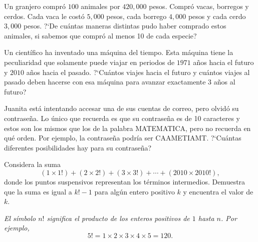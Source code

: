 \begin{Solucion}
  
\end{Solucion}

\begin{Problema}{2}
  Un granjero compr\'o $100$ animales por $420,000$ pesos. Compr\'o
  vacas, borregos y cerdos. Cada vaca le cost\'o $5,000$ pesos, cada
  borrego $4,000$ pesos y cada cerdo $3,000$ pesos. ?`De cu\'antas
  maneras distintas pudo haber comprado estos animales, si sabemos que
  compr\'o al menos 10 de cada especie?
\end{Problema}

\begin{Solucion}
  
\end{Solucion}

\begin{Problema}{3}
  Un cient\'ifico ha inventado una m\'aquina del tiempo. Esta
  m\'aquina tiene la peculiaridad que solamente puede viajar en
  periodos de $1971$ a\~nos hacia el futuro y $2010$ a\~nos hacia el
  pasado. ?`Cu\'antos viajes hacia el futuro y cu\'antos viajes al
  pasado deben hacerse con esa m\'aquina para avanzar exactamente $3$
  a\~nos al futuro?
\end{Problema}

\begin{Solucion}
  
\end{Solucion}

\begin{Problema}{4}
  Juanita est\'a intentando accesar una de sus cuentas de correo, pero
  olvid\'o su contrase\~na. Lo \'unico que recuerda es que su
  contrase\~na es de 10 caracteres y estos son los mismos que los de
  la palabra MATEMATICA, pero no recuerda en qu\'e orden. Por ejemplo,
  la contrase\~na podr\'ia ser CAAMETIAMT. ?`Cu\'antas diferentes
  posibilidades hay para su contrase\~na?
\end{Problema}

\begin{Solucion}
  
\end{Solucion}

\begin{Problema}{5}
  Considera la suma
  $$
  (1 \times 1!) + (2 \times 2!) + (3 \times 3!) +  \cdots + (2010 \times 2010!),
  $$ 
  donde los puntos suspensivos representan los t\'erminos
  intermedios. Demuestra que la suma es igual a $k!-1$ para alg\'un
  entero positivo $k$ y encuentra el valor de $k$.

  {\sl El s\'imbolo $n!$ significa el producto de los enteros
    positivos de $1$ hasta $n$. Por ejemplo,
    $$
    5!=1\times 2  \times 3 \times 4 \times 5=120.
    $$}
\end{Problema}

